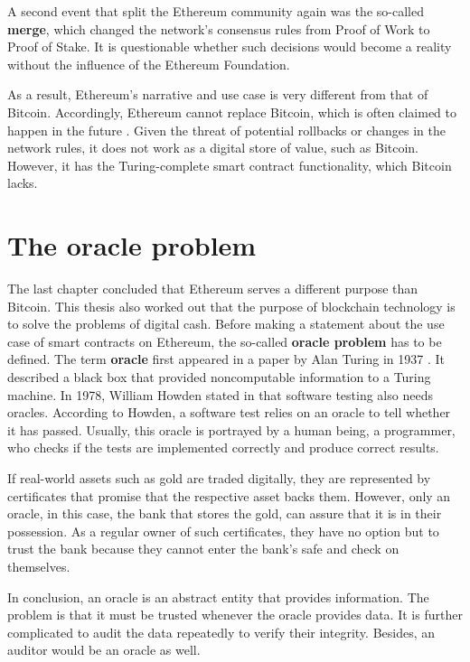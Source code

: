A second event that split the Ethereum community again was the so-called \textbf{merge}, which changed the network's consensus rules from Proof of Work to Proof of Stake.
It is questionable whether such decisions would become a reality without the influence of the Ethereum Foundation. 

As a result, Ethereum's narrative and use case is very different from that of Bitcoin.
Accordingly, Ethereum cannot replace Bitcoin, which is often claimed to happen in the future \cite{flippening_2023}.
Given the threat of potential rollbacks or changes in the network rules, it does not work as a digital store of value, such as Bitcoin. 
However, it has the Turing-complete smart contract functionality, which Bitcoin lacks.

\section{The oracle problem}
The last chapter concluded that Ethereum serves a different purpose than Bitcoin. 
This thesis also worked out that the purpose of blockchain technology is to solve the problems of digital cash.
Before making a statement about the use case of smart contracts on Ethereum, the so-called \textbf{oracle problem} has to be defined.
The term \textbf{oracle} first appeared in a paper by Alan Turing in 1937 \cite{turing1939systems}. 
It described a black box that provided noncomputable information to a Turing machine.
In 1978, William Howden stated in \cite{10.1109/TSE.1978.231514} that software testing also needs oracles.
According to Howden, a software test relies on an oracle to tell whether it has passed.
Usually, this oracle is portrayed by a human being, a programmer, who checks if the tests are implemented correctly and produce correct results.

If real-world assets such as gold are traded digitally, they are represented by certificates that promise that the respective asset backs them.
However, only an oracle, in this case, the bank that stores the gold, can assure that it is in their possession. 
As a regular owner of such certificates, they have no option but to trust the bank because they cannot enter the bank's safe and check on themselves.

In conclusion, an oracle is an abstract entity that provides information.
The problem is that it must be trusted whenever the oracle provides data.
It is further complicated to audit the data repeatedly to verify their integrity. 
Besides, an auditor would be an oracle as well.

